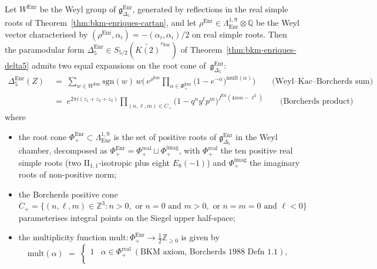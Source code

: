 \begin{theorem}
\label{thm:bkm-enriques-denominator}
Let $W^{\mathrm{Enr}}$ be the Weyl group of
$\mathfrak{g}_{\Delta_5}^{\mathrm{Enr}}$, generated by reflections
in the real simple roots of
Theorem~\textup{\ref{thm:bkm-enriques-cartan}}, and let
$\rho^{\mathrm{Enr}}\in\Lambda^{1,9}_{\mathrm{Enr}}\otimes\mathbb{Q}$
be the Weyl vector characterised by $(\rho^{\mathrm{Enr}},\alpha_i) = -(\alpha_i,\alpha_i)/2$
on real simple roots. Then the paramodular form
$\Delta_5^{\mathrm{Enr}}\in S_{5/2}(\widetilde{K(2)}^{v_{\mathrm{Enr}}})$
of Theorem~\textup{\ref{thm:bkm-enriques-delta5}} admits two equal
expansions on the root cone of~$\mathfrak{g}_{\Delta_5}^{\mathrm{Enr}}$:
\begin{align}
 \Delta_5^{\mathrm{Enr}}(Z)
 \;&=\;
 \sum_{w\in W^{\mathrm{Enr}}} \mathrm{sgn}(w)\,
 w\!\Biggl(\,e^{\rho^{\mathrm{Enr}}}
 \prod_{\alpha\in\Phi_+^{\mathrm{Enr}}}
 \bigl(1 - e^{-\alpha}\bigr)^{\mathrm{mult}(\alpha)}\Biggr)
 \qquad\text{(Weyl--Kac--Borcherds sum)}
 \label{eq:bkm-enriques-denominator-sum} \\
 \;&=\;
 e^{2\pi i(z_1 + z_2 + z_3)}
 \prod_{(n,\ell,m)\in C_+}
 \bigl(1 - q^n y^\ell p^m\bigr)^{f^{\mathrm{En}}(4nm - \ell^2)}
 \qquad\text{(Borcherds product)}
 \label{eq:bkm-enriques-denominator-product}
\end{align}
where
\begin{itemize}
\item the root cone $\Phi_+^{\mathrm{Enr}} \subset
 \Lambda^{1,9}_{\mathrm{Enr}}$ is the set of positive roots of
 $\mathfrak{g}_{\Delta_5}^{\mathrm{Enr}}$ in the Weyl chamber, decomposed as
 $\Phi_+^{\mathrm{Enr}} = \Phi_+^{\mathrm{real}}\sqcup\Phi_+^{\mathrm{imag}}$,
 with $\Phi_+^{\mathrm{real}}$ the ten positive real simple roots
 (two $\mathrm{II}_{1,1}$-isotropic plus eight $E_8(-1)$)
 and $\Phi_+^{\mathrm{imag}}$ the imaginary roots of non-positive norm;
\item the Borcherds positive cone
 $C_+ = \{(n,\ell,m) \in \mathbb{Z}^3 : n > 0,
 \text{ or } n = 0\text{ and }m > 0,
 \text{ or } n = m = 0\text{ and }\ell < 0\}$
 parameterises integral points on the Siegel upper half-space;
\item the multiplicity function $\mathrm{mult}:
 \Phi_+^{\mathrm{Enr}} \to \tfrac{1}{2}\mathbb{Z}_{\geq 0}$ is given by
 \[
 \mathrm{mult}(\alpha)
 \;=\;
 \begin{cases}
 1 & \alpha\in\Phi_+^{\mathrm{real}}\ (\text{BKM axiom, Borcherds 1988 Defn~1.1}),\\

\end{cases}\]
\end{itemize}
\end{theorem}
